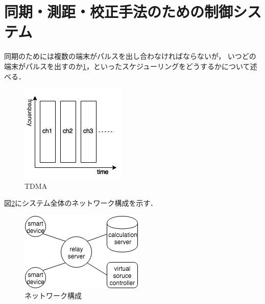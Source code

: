 
\section{同期・測距・校正手法のための制御システム}
同期のためには複数の端末がパルスを出し合わなければならないが，
いつどの端末がパルスを出すのか\ref{fig:TDMA}，といったスケジューリングをどうするかについて述べる．

\begin{figure}[tb]\centering
  \hspace{-2mm}\includegraphics[clip,width=1.1\hsize]{img/TDMA.png}
  \caption{TDMA}\label{fig:TDMA}
\end{figure}

図\ref{fig:network2}にシステム全体のネットワーク構成を示す．

\begin{figure}[tb]\centering
  \hspace{-2mm}\includegraphics[clip,width=1.1\hsize]{img/network2.png}
  \caption{ネットワーク構成}\label{fig:network2}
\end{figure}

